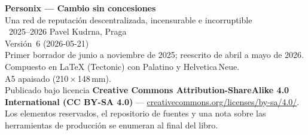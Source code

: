 \thispagestyle{empty}
\ifdefined\printmode\vspace*{\fill}\else{}\fi
\begin{flushleft}\small\sffamily
\textbf{Personix --- Cambio sin concesiones}\\[0.3em]
Una red de reputación descentralizada, incensurable e incorruptible\\[1.4em]

\textcopyright\ 2025--2026 Pavel Kudrna, Praga\\[0.4em]

Versión~6 (2026-05-21)\\
Primer borrador de junio a noviembre de 2025; reescrito de abril a mayo de 2026.\\[1.4em]

Compuesto en \LaTeX{} (Tectonic) con Palatino y Helvetica\,Neue.\\
A5 apaisado (210\,$\times$\,148\,mm).\\[1.4em]

Publicado bajo licencia \textbf{Creative Commons Attribution-ShareAlike 4.0
International (CC BY-SA 4.0)} ---
\href{https://creativecommons.org/licenses/by-sa/4.0/}{creativecommons.org/licenses/by-sa/4.0/}.
Los elementos reservados, el repositorio de fuentes y una nota sobre las
herramientas de producción se enumeran al final del libro.
\end{flushleft}
\ifdefined\printmode\else{}\fi
\clearpage
